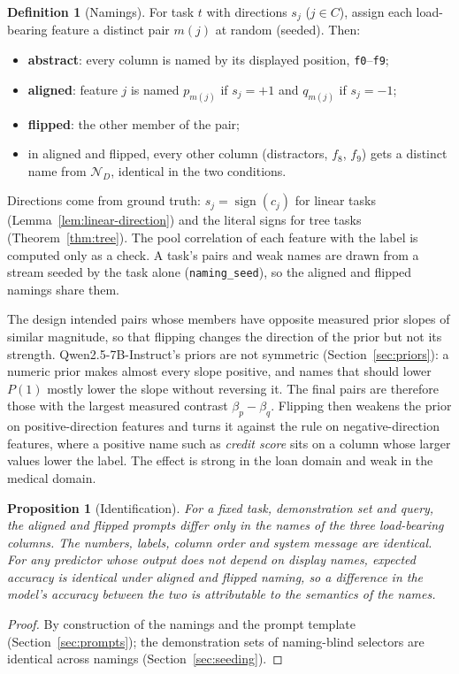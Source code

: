\documentclass[11pt,a4paper]{article}
\newcommand{\1}{\mathbf{1}}
\DeclareMathOperator{\sign}{sign}
\theoremstyle{plain}
\newtheorem{proposition}[theorem]{Proposition}
\theoremstyle{definition}
\newtheorem{definition}[theorem]{Definition}
\theoremstyle{remark}
\begin{document}
\begin{definition}[Namings]
For task $t$ with directions $s_j$ ($j \in C$), assign each load-bearing
feature a distinct pair $m(j)$ at random (seeded). Then:
\begin{itemize}[nosep]
  \item \textbf{abstract}: every column is named by its displayed position,
        \texttt{f0}--\texttt{f9};
  \item \textbf{aligned}: feature $j$ is named $p_{m(j)}$ if $s_j = +1$ and
        $q_{m(j)}$ if $s_j = -1$;
  \item \textbf{flipped}: the other member of the pair;
  \item in aligned and flipped, every other column (distractors, $f_8$,
        $f_9$) gets a distinct name from $\mathcal{N}_D$, identical in the
        two conditions.
\end{itemize}
\end{definition}

Directions come from ground truth: $s_j = \sign(c_j)$ for linear tasks
(Lemma~\ref{lem:linear-direction}) and the literal signs for tree tasks
(Theorem~\ref{thm:tree}). The pool correlation of each feature with the label
is computed only as a check. A task's pairs and weak names are drawn from
a stream seeded by the task alone (\texttt{naming\_seed}), so the aligned
and flipped namings share them.

The design intended pairs whose members have opposite measured prior slopes
of similar magnitude, so that flipping changes the direction of the prior but
not its strength. Qwen2.5-7B-Instruct's priors are not symmetric
(Section~\ref{sec:priors}): a numeric prior makes almost every slope
positive, and names that should lower $P(1)$ mostly lower the slope without
reversing it. The final pairs are therefore those with the largest measured
contrast $\beta_p - \beta_q$. Flipping then weakens the prior on
positive-direction features and turns it against the rule on
negative-direction features, where a positive name such as
\emph{credit score} sits on a column whose larger values lower the label. The
effect is strong in the loan domain and weak in the medical domain.

\begin{proposition}[Identification]
\label{prop:identification}
For a fixed task, demonstration set and query, the aligned and flipped
prompts differ only in the names of the three load-bearing columns. The
numbers, labels, column order and system message are identical. For any
predictor whose output does not depend on display names, expected accuracy
is identical under aligned and flipped naming, so a difference in the
model's accuracy between the two is attributable to the semantics of the
names.
\end{proposition}
\begin{proof}
By construction of the namings and the prompt template
(Section~\ref{sec:prompts}); the demonstration sets of naming-blind
selectors are identical across namings (Section~\ref{sec:seeding}).
\end{proof}
\end{document}
